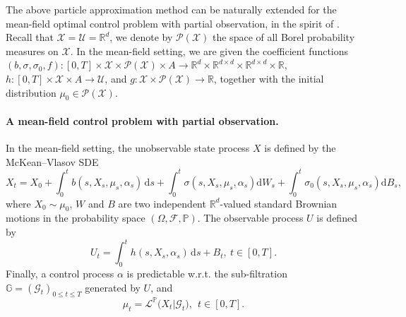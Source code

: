 \documentclass[11pt]{article}
\numberwithin{equation}{section}
\theoremstyle{plain}
\theoremstyle{definition}
\theoremstyle{remark}
\newcommand{\R}{\mathbb{R}}
\newcommand{\dd}{\mathrm{d}}
\newcommand{\Fc}{\mathcal{F}}
\newcommand{\Gc}{\mathcal{G}}
\newcommand{\Lc}{\mathcal{L}}
\newcommand{\Pc}{\mathcal{P}}
\newcommand{\Xc}{\mathcal{X}}
\newcommand{\G}{\mathbb{G}}
\newcommand{\bP}{\mathbb{P}}
\begin{document}
	The above particle approximation method can be naturally extended for the mean-field optimal control problem with partial observation, in the spirit of  \cite{buckdahn2017mean}.
	Recall that $\Xc = \mathcal{U} = \R^d$, we denote by $\Pc(\Xc)$  the space of all Borel probability measures on $\Xc$.
	In the mean-field setting, we are given the coefficient functions $(b, \sigma, \sigma_0, f): [0, T] \times \mathcal{X} \times \mathcal{P}(\mathcal{X}) \times A \to \mathbb{R}^d\times \mathbb{R}^{d\times d}\times \mathbb{R}^{d\times d} \times \R$, $h:[0,T]\times \mathcal{X} \times A \to \mathcal{U}$, and $g:\mathcal{X}\times \mathcal{P}(\mathcal{X})\to \R$,
	together with the initial distribution $\mu_0 \in \mathcal{P}(\Xc)$.
	
	\paragraph{A mean-field control problem with partial observation.}
	In the mean-field setting, the unobservable state process $X$ is defined by the McKean--Vlasov SDE
	\begin{equation}
		X_t 
		= 
		X_0
		+
		\int_0^t  b(s, X_s, \mu_s,  \alpha_s)\,\dd s 
		+
		\int_0^t \sigma(s, X_s, \mu_s,  \alpha_s) \dd W_s 
		+
		\int_0^t \sigma_0(s, X_s, \mu_s,  \alpha_s)\dd B_s,
	\end{equation}
	where $X_0 \sim \mu_0$, $W$ and $B$ are two independent $\R^d$-valued standard Brownian motions in the probability space $(\Omega, \Fc, \bP)$.
	The observable process $U$ is defined by
	\begin{equation}
		U_t 
		=
		\int_0^t h(s, X_s, \alpha_s)\,\dd s 
		+ 
		B_t,
		~
		t \in [0,T]. 
	\end{equation}
	Finally, a control process $\alpha$ is predictable w.r.t. the sub-filtration  $\G = (\Gc_t)_{0 \le t \le T}$ generated by $U$,
	and
	$$
	\mu_t = \Lc^{\bP} \big( X_t \big| \Gc_t \big),
	~~t \in [0,T].
	$$
	
\end{document}
